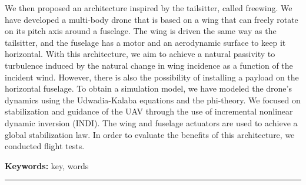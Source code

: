 \begin{vcenterpage}
We then proposed an architecture inspired by the tailsitter, called freewing. We have developed a multi-body drone that is based on a wing that can freely rotate on its pitch axis around a fuselage. The wing is driven the same way as the tailsitter, and the fuselage has a motor and an aerodynamic surface to keep it horizontal. With this architecture, we aim to achieve a natural passivity to turbulence induced by the natural change in wing incidence as a function of the incident wind. However, there is also the possibility of installing a payload on the horizontal fuselage. To obtain a simulation model, we have modeled the drone's dynamics using the Udwadia-Kalaba equations and the phi-theory. We focused on stabilization and guidance of the UAV through the use of incremental nonlinear dynamic inversion (INDI). The wing and fuselage actuators are used to achieve a global stabilization law. In order to evaluate the benefits of this architecture, we conducted flight tests.

{\large\textbf{Keywords:}}
key, words

\noindent\rule[2pt]{\textwidth}{0.5pt}
\end{vcenterpage}
